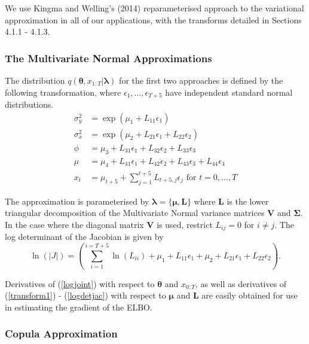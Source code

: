 \documentclass[12pt,a4paper]{article}%
\numberwithin{equation}{section}
\begin{document}
We use Kingma and Welling's (2014) reparameterised approach to the variational approximation in all of our applications, with the transforms detailed in Sections 4.1.1 - 4.1.3.

\subsubsection{The Multivariate Normal Approximations}

The distribution $q(\boldsymbol{\theta}, x_{1:T} | \boldsymbol{\lambda})$ for the first two approaches is defined by the following transformation, where $\epsilon_{1}, \dots, \epsilon_{T+5}$ have independent standard normal distributions.
\begin{align}
\sigma^2_y &= \exp(\mu_1 + L_{11} \epsilon_1)  \label{transform1} \\
\sigma^2_x &= \exp(\mu_2 + L_{21} \epsilon_1 + L_{22} \epsilon_2) \label{transform2} \\
\phi &= \mu_3 + L_{31} \epsilon_1 + L_{32} \epsilon_2 + L_{33} \epsilon_3 \label{transform3} \\
\mu &= \mu_4 + L_{41} \epsilon_1 + L_{42} \epsilon_2 + L_{43} \epsilon_3 + L_{44} \epsilon_4 \label{transform4} \\
x_t &= \mu_{t+5} + \sum_{j=1}^{t+5} L_{t+5, j} \epsilon_j \mbox{ for } t = 0, \dots, T \label{transform5} 
\end{align}

The approximation is parameterised by $\boldsymbol{\lambda} = \{ \boldsymbol{\mu}, \textbf{L} \}$ where $\textbf{L}$ is the lower triangular decomposition of the Multivariate Normal variance matrices $\textbf{V}$ and $\boldsymbol{\Sigma}$. In the case where the diagonal matrix $\textbf{V}$ is used, restrict $L_{ij} = 0$ for $i \neq j$.
The log determinant of the Jacobian is given by
\begin{equation}
\label{logdetjac}
\ln(|J|) = \left(\sum_{i = 1}^{i = T+5} \ln(L_{ii}) + \mu_1 + L_{11} \epsilon_1 + \mu_2 + L_{21} \epsilon_1 + L_{22} \epsilon_2\right).  
\end{equation}

Derivatives of (\ref{logjoint}) with respect to $\boldsymbol{\theta}$ and $x_{0:T}$, as well as derivatives of (\ref{transform1}) - (\ref{logdetjac}) with respect to $\boldsymbol{\mu}$ and $\textbf{L}$ are easily obtained for use in estimating the gradient of the ELBO.

\subsubsection{Copula Approximation}
\end{document}
